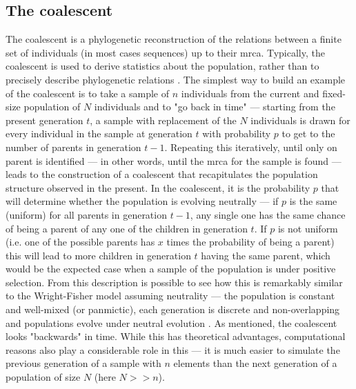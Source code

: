 \subsection{The coalescent}

The coalescent is a phylogenetic reconstruction of the relations between a finite set of individuals (in most cases sequences) up to their \ac{mrca}. Typically, the coalescent is used to derive statistics about the population, rather than to precisely describe phylogenetic relations \cite{Gillespie2004-xo}. The simplest way to build an example of the coalescent is to take a sample of $n$ individuals from the current and fixed-size population of $N$ individuals and to "go back in time" --- starting from the present generation $t$, a sample with replacement of the $N$ individuals is drawn for every individual in the sample at generation $t$ with probability $p$ to get to the number of parents in generation $t-1$. Repeating this iteratively, until only on parent is identified --- in other words, until the \ac{mrca} for the sample is found --- leads to the construction of a coalescent that recapitulates the population structure observed in the present. In the coalescent, it is the probability $p$ that will determine whether the population is evolving neutrally --- if $p$ is the same (uniform) for all parents in generation $t-1$, any single one has the same chance of being a parent of any one of the children in generation $t$. If $p$ is not uniform (i.e. one of the possible parents has $x$ times the probability of being a parent) this will lead to more children in generation $t$ having the same parent, which would be the expected case when a sample of the population is under positive selection. From this description is possible to see how this is remarkably similar to the Wright-Fisher model assuming neutrality --- the population is constant and well-mixed (or panmictic), each generation is discrete and non-overlapping and populations evolve under neutral evolution \cite{Gillespie2004-xo}. As mentioned, the coalescent looks "backwards" in time. While this has theoretical advantages, computational reasons also play a considerable role in this --- it is much easier to simulate the previous generation of a sample with $n$ elements than the next generation of a population of size $N$ (here $N>>n$).

